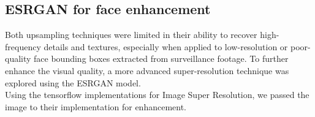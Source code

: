 \subsection{ESRGAN for face enhancement}

Both upsampling techniques were limited in their ability to recover high-frequency details and textures, especially when applied to low-resolution or poor-quality face bounding boxes extracted from surveillance footage. To further enhance the visual quality, a more advanced super-resolution technique was explored using the ESRGAN model.\\

Using the tensorflow implementations for Image Super Resolution, we passed the image to their implementation for enhancement. 
